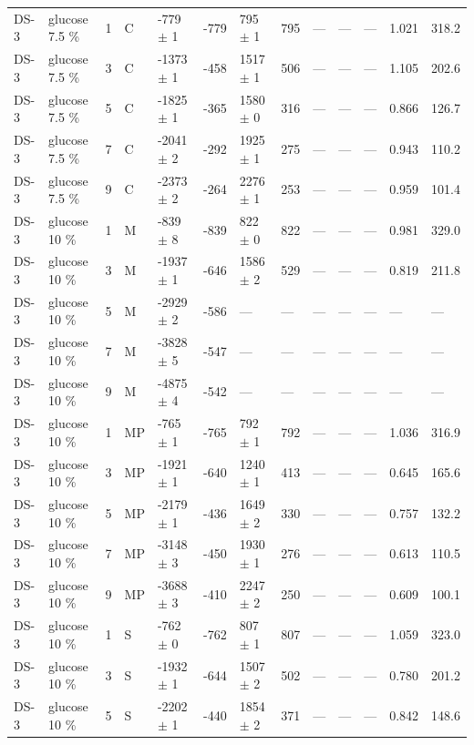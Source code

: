 \documentclass[11pt,a4paper]{article}
\begin{document}
\begin{landscape}
{\begin{longtable}{@{}lllllllllllll@{}}
DS-3 & glucose 7.5 \% & 1 & C & -779 $\pm$ 1 & -779 & 795 $\pm$ 1 & 795 & --- & --- & --- & 1.021 & 318.2 \\
DS-3 & glucose 7.5 \% & 3 & C & -1373 $\pm$ 1 & -458 & 1517 $\pm$ 1 & 506 & --- & --- & --- & 1.105 & 202.6 \\
DS-3 & glucose 7.5 \% & 5 & C & -1825 $\pm$ 1 & -365 & 1580 $\pm$ 0 & 316 & --- & --- & --- & 0.866 & 126.7 \\
DS-3 & glucose 7.5 \% & 7 & C & -2041 $\pm$ 2 & -292 & 1925 $\pm$ 1 & 275 & --- & --- & --- & 0.943 & 110.2 \\
DS-3 & glucose 7.5 \% & 9 & C & -2373 $\pm$ 2 & -264 & 2276 $\pm$ 1 & 253 & --- & --- & --- & 0.959 & 101.4 \\
DS-3 & glucose 10 \% & 1 & M & -839 $\pm$ 8 & -839 & 822 $\pm$ 0 & 822 & --- & --- & --- & 0.981 & 329.0 \\
DS-3 & glucose 10 \% & 3 & M & -1937 $\pm$ 1 & -646 & 1586 $\pm$ 2 & 529 & --- & --- & --- & 0.819 & 211.8 \\
DS-3 & glucose 10 \% & 5 & M & -2929 $\pm$ 2 & -586 & --- & --- & --- & --- & --- & --- & --- \\
DS-3 & glucose 10 \% & 7 & M & -3828 $\pm$ 5 & -547 & --- & --- & --- & --- & --- & --- & --- \\
DS-3 & glucose 10 \% & 9 & M & -4875 $\pm$ 4 & -542 & --- & --- & --- & --- & --- & --- & --- \\
DS-3 & glucose 10 \% & 1 & MP & -765 $\pm$ 1 & -765 & 792 $\pm$ 1 & 792 & --- & --- & --- & 1.036 & 316.9 \\
DS-3 & glucose 10 \% & 3 & MP & -1921 $\pm$ 1 & -640 & 1240 $\pm$ 1 & 413 & --- & --- & --- & 0.645 & 165.6 \\
DS-3 & glucose 10 \% & 5 & MP & -2179 $\pm$ 1 & -436 & 1649 $\pm$ 2 & 330 & --- & --- & --- & 0.757 & 132.2 \\
DS-3 & glucose 10 \% & 7 & MP & -3148 $\pm$ 3 & -450 & 1930 $\pm$ 1 & 276 & --- & --- & --- & 0.613 & 110.5 \\
DS-3 & glucose 10 \% & 9 & MP & -3688 $\pm$ 3 & -410 & 2247 $\pm$ 2 & 250 & --- & --- & --- & 0.609 & 100.1 \\
DS-3 & glucose 10 \% & 1 & S & -762 $\pm$ 0 & -762 & 807 $\pm$ 1 & 807 & --- & --- & --- & 1.059 & 323.0 \\
DS-3 & glucose 10 \% & 3 & S & -1932 $\pm$ 1 & -644 & 1507 $\pm$ 2 & 502 & --- & --- & --- & 0.780 & 201.2 \\
DS-3 & glucose 10 \% & 5 & S & -2202 $\pm$ 1 & -440 & 1854 $\pm$ 2 & 371 & --- & --- & --- & 0.842 & 148.6 \\

\end{longtable}}
\end{landscape}
\end{document}
